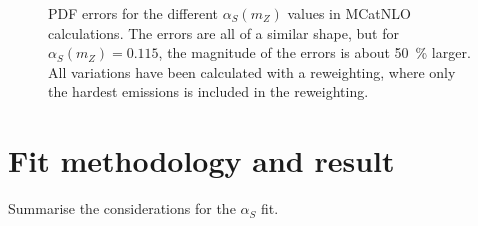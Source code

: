 \documentclass[a4paper]{scrartcl}
\newcommand{\alphas}{\ensuremath{\alpha_S}\xspace}
\begin{document}
\begin{figure}[p]
    \caption{PDF errors for the different $\alphas(m_Z)$ values
    in MCatNLO calculations.
    The errors are all of a similar shape, but for $\alphas(m_Z)=0.115$,
    the magnitude of the errors is about \SI{50}{\percent} larger.
    All variations have been calculated with a reweighting,
    where only the hardest emissions is included in the reweighting.}
    \label{fig:pdferrors}
\end{figure}
\section{Fit methodology and result}
Summarise the considerations for the \alphas fit.



\end{document}
